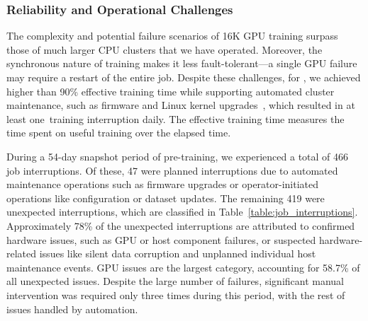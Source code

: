 \documentclass[dvipsnames]{fairmeta}
\begin{document}
\subsubsection{Reliability and Operational Challenges}

The complexity and potential failure scenarios of 16K GPU training surpass those of much larger CPU clusters that we have operated. Moreover, the synchronous nature of training makes it less fault-tolerant---a single GPU failure may require a restart of the entire job. Despite these challenges, for \llamathree, we achieved higher than 90\% effective training time while supporting automated cluster maintenance, such as firmware and Linux kernel upgrades~\citep{leonhardi2024maintenance}, which resulted in at least one~training interruption daily. The effective training time measures the time spent on useful training over the elapsed time.

During a 54-day snapshot period of pre-training, we experienced a total of 466 job interruptions. Of these, 47 were planned interruptions due to automated maintenance operations such as firmware upgrades or operator-initiated operations like configuration or dataset updates. The remaining 419 were unexpected interruptions, which are classified in Table~\ref{table:job_interruptions}.
Approximately 78\% of the unexpected interruptions are attributed to confirmed hardware issues, such as GPU or host component failures, or suspected hardware-related issues like silent data corruption and unplanned individual host maintenance events. GPU issues are the largest category, accounting for 58.7\% of all unexpected issues.  Despite the large number of failures, significant manual intervention was required only three times during this period, with the rest of issues handled by automation. 
\end{document}
